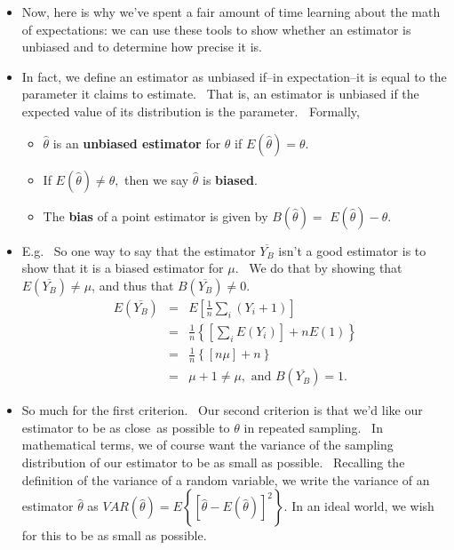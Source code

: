 \documentclass[11pt]{article}
\begin{document}
\begin{itemize}
\item Now, here is why we've spent a fair amount of time learning about the
math of expectations: we can use these tools to show whether an estimator is
unbiased and to determine how precise it is.

\item In fact, we define an estimator as unbiased if--in expectation--it is
equal to the parameter it claims to estimate. \ That is, an estimator is
unbiased if the expected value of its distribution is the parameter. $\ $%
Formally,

\begin{itemize}
\item $\widehat{\theta }$ is an \textbf{unbiased estimator} for $\theta $ if 
$E(\widehat{\theta })=\theta .$ \ 

\item If $E(\widehat{\theta })\neq \theta ,$ then we say $\widehat{\theta }$
is \textbf{biased}. \ 

\item The \textbf{bias }of a point estimator is given by $B(\widehat{\theta }%
)=$ $E(\widehat{\theta })-\theta .$
\end{itemize}

\item E.g. \ So one way to say that the estimator $\overline{Y_{B}}$ isn't a
good estimator is to show that it is a biased estimator for $\mu .$ \ We do
that by showing that $E(\overline{Y_{B}})\neq \mu $, and thus that $B(%
\overline{Y_{B}})\neq 0.$ 
\begin{eqnarray*}
E(\overline{Y_{B}}) &=&E\left[ \frac{1}{n}\sum_{i}(Y_{i}+1)\right] \\
&=&\frac{1}{n}\left\{ \left[ \sum_{i}E(Y_{i})\right] +nE(1)\right\} \\
&=&\frac{1}{n}\left\{ \left[ n\mu \right] +n\right\} \\
&=&\mu +1\neq \mu ,\text{ and }B(\overline{Y_{B}})=1.
\end{eqnarray*}

\item So much for the first criterion. \ Our second criterion is that we'd
like our estimator to be as close\ as possible to $\theta $ in repeated
sampling. \ In mathematical terms, we of course want the variance of the
sampling distribution of our estimator to be as small as possible. \
Recalling the definition of the variance of a random variable, we write the
variance of an estimator $\widehat{\theta }$ as $VAR(\widehat{\theta }%
)=E\left\{ [\widehat{\theta }-E(\widehat{\theta })]^{2}\right\} .$ In an
ideal world, we wish for this to be as small as possible.


\end{itemize}
\end{document}
